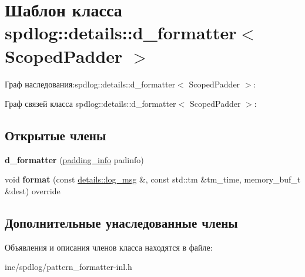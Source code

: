 \hypertarget{classspdlog_1_1details_1_1d__formatter}{}\section{Шаблон класса spdlog\+:\+:details\+:\+:d\+\_\+formatter$<$ Scoped\+Padder $>$}
\label{classspdlog_1_1details_1_1d__formatter}


Граф наследования\+:spdlog\+:\+:details\+:\+:d\+\_\+formatter$<$ Scoped\+Padder $>$\+:


Граф связей класса spdlog\+:\+:details\+:\+:d\+\_\+formatter$<$ Scoped\+Padder $>$\+:
\subsection*{Открытые члены}
\begin{DoxyCompactItemize}
\item 
\mbox{\label{classspdlog_1_1details_1_1d__formatter_ae76fa31e4f7a580659fb4066d6570124}} 
{\bfseries d\+\_\+formatter} (\hyperlink{structspdlog_1_1details_1_1padding__info}{padding\+\_\+info} padinfo)
\item 
\mbox{\label{classspdlog_1_1details_1_1d__formatter_ab1f765ee77d0b6fcd0535211ae1a39e8}} 
void {\bfseries format} (const \hyperlink{structspdlog_1_1details_1_1log__msg}{details\+::log\+\_\+msg} \&, const std\+::tm \&tm\+\_\+time, memory\+\_\+buf\+\_\+t \&dest) override
\end{DoxyCompactItemize}
\subsection*{Дополнительные унаследованные члены}


Объявления и описания членов класса находятся в файле\+:\begin{DoxyCompactItemize}
\item 
inc/spdlog/pattern\+\_\+formatter-\/inl.\+h\end{DoxyCompactItemize}
